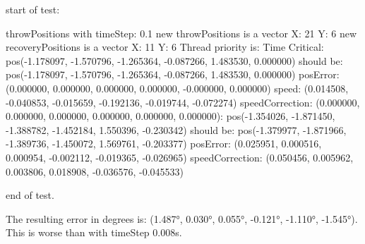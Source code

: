 start of test: \newline 

throwPositions with timeStep:  0.1\newline 
new throwPositions is a vector X: 21 Y:  6\newline 
new recoveryPositions is a vector X: 11 Y:  6\newline 
Thread priority is: Time Critical\newline 
[0.000000s - Step 0/21]:\newline 
\hspace{1cm}        pos(-1.178097, -1.570796, -1.265364, -0.087266, 1.483530, 0.000000) should be:\newline 
\hspace{1cm}        pos(-1.178097, -1.570796, -1.265364, -0.087266, 1.483530, 0.000000)\newline 
\hspace{1cm}        posError: (0.000000, 0.000000, 0.000000, 0.000000, -0.000000, 0.000000)\newline 
\hspace{1cm}        speed: (0.014508, -0.040853, -0.015659, -0.192136, -0.019744, -0.072274)\newline 
\hspace{1cm}        speedCorrection: (0.000000, 0.000000, 0.000000, 0.000000, 0.000000, 0.000000)\newline 
[2.000000s - Step 20/21]:\newline 
\hspace{1cm}        pos(-1.354026, -1.871450, -1.388782, -1.452184, 1.550396, -0.230342) should be:\newline 
\hspace{1cm}        pos(-1.379977, -1.871966, -1.389736, -1.450072, 1.569761, -0.203377)\newline 
\hspace{1cm}        posError: (0.025951, 0.000516, 0.000954, -0.002112, -0.019365, -0.026965)\newline 
\hspace{1cm}        speedCorrection: (0.050456, 0.005962, 0.003806, 0.018908, -0.036576, -0.045533) \newline 
 
end of test.\newline 

The resulting error in degrees is: (1.487°, 0.030°, 0.055°, -0.121°, -1.110°, -1.545°). This is worse than with timeStep 0.008s.\newline 

